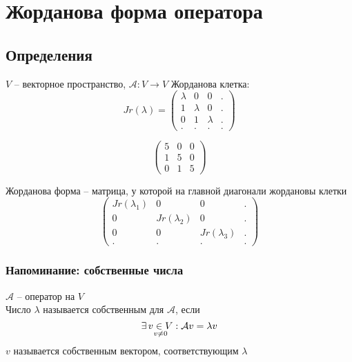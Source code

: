 \chapter{Жорданова форма оператора}

\section{Определения}

\begin{definition}
	$ V $ -- векторное пространство, $ \mathcal{A} : V \to V $
	Жорданова клетка:
	$$ Jr(\lambda) =
	\begin{pmatrix}
		\lambda & 0 & 0 & . \\
		1 & \lambda & 0 & . \\
		0 & 1 & \lambda & . \\
		. & . & . & .
	\end{pmatrix} $$
\end{definition}

\begin{eg}
	$$
	\begin{pmatrix}
		5 & 0 & 0 \\
		1 & 5 & 0 \\
		0 & 1 & 5
	\end{pmatrix} $$
\end{eg}

\begin{definition}
	Жорданова форма -- матрица, у которой на главной диагонали жордановы клетки
	$$
	\begin{pmatrix}
		Jr(\lambda_1) & 0 & 0 & . \\
		0 & Jr(\lambda_2) & 0 & . \\
		0 & 0 & Jr(\lambda_3) & . \\
		. & . & . & .
	\end{pmatrix} $$
\end{definition}

\subsection{Напоминание: собственные числа}

\begin{definition}
	$ \mathcal{A} $ -- оператор на $ V $ \\
	Число $ \lambda $ называется собственным для $ \mathcal{A} $, если
	$$ \exists\, \underset{v \ne 0}{v \in V} : \mathcal{A}v = \lambda v $$
	$ v $ называется собственным вектором, соответствующим $ \lambda $
\end{definition}

